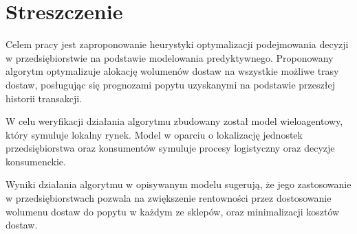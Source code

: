 \documentclass[polish, twoside, 12pt, a4paper]{article}
\theoremstyle{definition}
\theoremstyle{plain}
\theoremstyle{remark}
\begin{document}
\clearpage
{}
\listoffigures



\clearpage
{}
\section*{Streszczenie}


Celem pracy jest zaproponowanie heurystyki optymalizacji podejmowania decyzji w przedsiębiorstwie na podstawie modelowania predyktywnego. Proponowany algorytm optymalizuje alokację wolumenów dostaw na wszystkie możliwe trasy dostaw, posługując się prognozami popytu uzyskanymi na podstawie przeszłej historii transakcji. 

W celu weryfikacji działania algorytmu zbudowany został model wieloagentowy, który symuluje lokalny rynek. Model w oparciu o lokalizację jednostek przedsiębiorstwa oraz konsumentów symuluje procesy logistyczny oraz decyzje konsumenckie. 

Wyniki działania algorytmu w opisywanym modelu sugerują, że jego zastosowanie w przedsiębiorstwach pozwala na zwiększenie rentowności przez dostosowanie wolumenu dostaw do popytu w każdym ze sklepów, oraz minimalizacji kosztów dostaw.
\end{document}
